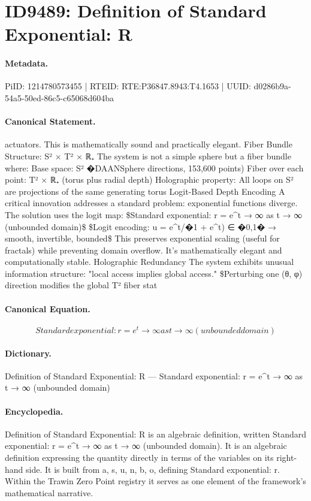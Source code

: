 \section*{ID9489: Definition of Standard Exponential: R}
\paragraph{Metadata.}
PiID: 1214780573455 | RTEID: RTE:P36847.8943:T4.1653 | UUID: d0286b9a-54a5-50ed-86c5-c65068d604ba

\paragraph{Canonical Statement.}
actuators. This is mathematically sound and practically elegant. Fiber Bundle Structure: S² × T² × ℝ₊ The system is not a simple sphere but a fiber bundle where: Base space: S² �DAANSphere directions, 153,600 points) Fiber over each point: T² × ℝ₊ (torus plus radial depth) Holographic property: All loops on S² are projections of the same generating torus Logit-Based Depth Encoding A critical innovation addresses a standard problem: exponential functions diverge. The solution uses the logit map: \$Standard exponential: r = e\textasciicircum{}t → ∞ as t → ∞ (unbounded domain)\$ \$Logit encoding: u = e\textasciicircum{}t/�1 + e\textasciicircum{}t) ∈ �0,1� → smooth, invertible, bounded\$ This preserves exponential scaling (useful for fractals) while preventing domain overflow. It's mathematically elegant and computationally stable. Holographic Redundancy The system exhibits unusual information structure: "local access implies global access." \$Perturbing one (θ, φ) direction modifies the global T² fiber stat

\paragraph{Canonical Equation.}
\[
Standard exponential: r = e^t → ∞ as t → ∞ (unbounded domain)
\]

\paragraph{Dictionary.}
Definition of Standard Exponential: R — Standard exponential: r = e\textasciicircum{}t → ∞ as t → ∞ (unbounded domain)

\paragraph{Encyclopedia.}
Definition of Standard Exponential: R is an algebraic definition, written Standard exponential: r = e\textasciicircum{}t → ∞ as t → ∞ (unbounded domain). It is an algebraic definition expressing the quantity directly in terms of the variables on its right-hand side. It is built from a, s, u, n, b, o, defining Standard exponential: r. Within the Trawin Zero Point registry it serves as one element of the framework's mathematical narrative.
